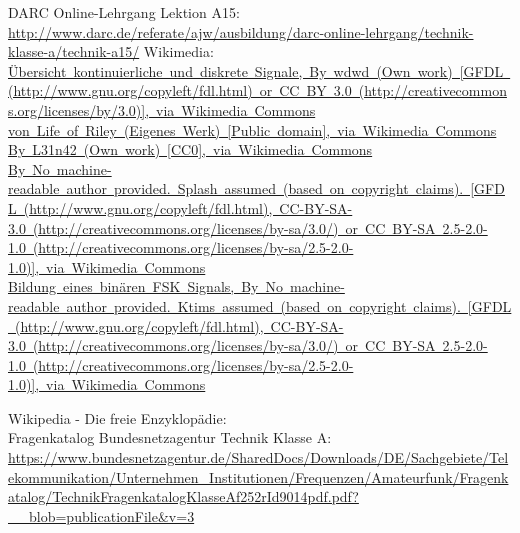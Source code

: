 \begin{thebibliography}{}
    DARC Online-Lehrgang Lektion A15:\\
    \url{http://www.darc.de/referate/ajw/ausbildung/darc-online-lehrgang/technik-klasse-a/technik-a15/}
   	Wikimedia:\\
    \href{https://de.wikipedia.org/wiki/Digitalsignal#/media/File:\%C3\%9Cbersicht_kontinuierliche_und_diskrete_Signale.svg}{\mbox{Übersicht kontinuierliche und diskrete Signale, By wdwd (Own work) [GFDL (http://www.gnu.org/copyleft/fdl.html) or CC BY 3.0 (http://creativecommons.org/licenses/by/3.0)], via Wikimedia Commons}}\\
    \href{https://commons.wikimedia.org/wiki/Category:Quantized_QAM?uselang=de#/media/File:Circular_16QAM.svg}{\mbox{von Life of Riley (Eigenes Werk) [Public domain], via Wikimedia Commons}}\\
    \href{https://de.wikipedia.org/wiki/Phasenmodulation#/media/File:Phase_modulation_(PHM).svg}{\mbox{By L31n42 (Own work) [CC0], via Wikimedia Commons}}\\
    \href{https://de.wikipedia.org/wiki/Quadraturphasenumtastung#/media/File:QPSK_Gray_Coded.svg}{\mbox{By No machine-readable author provided. Splash assumed (based on copyright claims). [GFDL (http://www.gnu.org/copyleft/fdl.html), CC-BY-SA-3.0 (http://creativecommons.org/licenses/by-sa/3.0/) or CC BY-SA 2.5-2.0-1.0 (http://creativecommons.org/licenses/by-sa/2.5-2.0-1.0)], via Wikimedia Commons}}\\
    \href{https://de.wikipedia.org/wiki/Frequenzumtastung#/media/File:Fsk.svg}{\mbox{Bildung eines binären FSK Signals, By No machine-readable author provided. Ktims assumed (based on copyright claims). [GFDL (http://www.gnu.org/copyleft/fdl.html), CC-BY-SA-3.0 (http://creativecommons.org/licenses/by-sa/3.0/) or CC BY-SA 2.5-2.0-1.0 (http://creativecommons.org/licenses/by-sa/2.5-2.0-1.0)], via Wikimedia Commons}}

      Wikipedia - Die freie Enzyklopädie:\\
     Fragenkatalog Bundesnetzagentur Technik Klasse A:\\
    \url{https://www.bundesnetzagentur.de/SharedDocs/Downloads/DE/Sachgebiete/Telekommunikation/Unternehmen_Institutionen/Frequenzen/Amateurfunk/Fragenkatalog/TechnikFragenkatalogKlasseAf252rId9014pdf.pdf?__blob=publicationFile&v=3}
\end{thebibliography}



